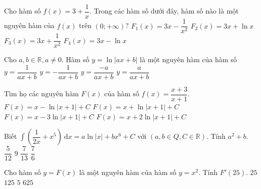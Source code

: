 \begin{ex}%
	Cho hàm số $f(x)=3+\dfrac{1}{x}$. Trong các hàm số dưới đây, hàm số nào là một nguyên hàm của $f(x)$ trên  $(0;+\infty)$?
	 \choice
		{$F_1(x)=3x-\dfrac{1}{x^2}$} 
		{\True  $F_2(x)=3x+\ln x$}
		 {$F_3(x)=3x+\dfrac{1}{x^2}$}
		 {$F_4(x)=3x-\ln x$}
\end{ex}

\begin{ex}%
	Cho $a, b \in \mathbb{R},  a \neq 0$. Hàm số $y = \ln|ax+b|$ là một nguyên hàm của hàm số
	 \choice
		{$y =  \dfrac{1}{ax+b}$}
		{$y  = -\dfrac{1}{ax+b}$}
		{$y = \dfrac{-a}{ax+b}$} 
		 {\True $y = \dfrac{a}{ax+b}$}
\end{ex}

\begin{ex}%
	Tìm họ các nguyên hàm  $F(x)$ của hàm số $f(x)=\dfrac{x+3}{x+1}$.
	 \choice
		{$F(x)=x-\ln|x+1|+C$} 
		{$F(x)=x+\ln|x+1|+C$} 
		 {$F(x)=x-3\ln|x+1|+C$}
		{\True $F(x)=x+2\ln|x+1|+C$} 
\end{ex}

\begin{ex}%
	Biết $\displaystyle\int\left(\dfrac{1}{2x}+x^5\right)\mathrm{~d} x=a \ln|x|+b x^6+C$ với $(a, b \in Q, C\in \mathbb{R})$. Tính  $a^2+b$.
	 \choice
		{\True  $\dfrac{5}{12}$}
		{$9$} 
		 {$\dfrac{7}{13}$}
		 {$\dfrac{7}{6}$}
\end{ex}

\begin{ex}%
	Cho hàm số $y=F(x)$ là một nguyên hàm  của hàm số $y=x^2$. Tính $F'(25)$.
	\choice 
		 {$25$}
		 {$125$}
		{$5$} 
		{\True $625$} 
\end{ex}

